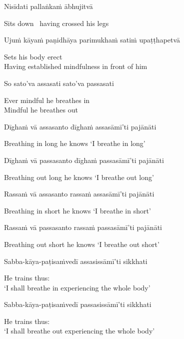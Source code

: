 Nisīdati pallaṅkaṁ ābhujitvā

\begin{english}
  Sits down \breathmark\ having crossed his legs
\end{english}

Ujuṁ kāyaṁ paṇidhāya parimukhaṁ satiṁ upaṭṭhapetvā

\begin{english}
  Sets his body erect\\
  Having established mindfulness in front of him
\end{english}

So sato'va assasati sato'va passasati

\begin{english}
  Ever mindful he breathes in\\
  Mindful he breathes out
\end{english}

Dīghaṁ vā assasanto dīghaṁ assasāmī'ti pajānāti

\begin{english}
  Breathing in long he knows `I breathe in long'
\end{english}

Dīghaṁ vā passasanto dīghaṁ passasāmī'ti pajānāti

\begin{english}
  Breathing out long he knows `I breathe out long'
\end{english}

Rassaṁ vā assasanto rassaṁ assasāmī'ti pajānāti

\begin{english}
  Breathing in short he knows `I breathe in short'
\end{english}

Rassaṁ vā passasanto rassaṁ passasāmī'ti pajānāti

\begin{english}
  Breathing out short he knows `I breathe out short'
\end{english}

Sabba-kāya-paṭisaṁvedī assasissāmī'ti sikkhati

\begin{english}
  He trains thus:\\
  `I shall breathe in experiencing the whole body'
\end{english}

Sabba-kāya-paṭisaṁvedī passasissāmī'ti sikkhati

\begin{english}
  He trains thus:\\
  `I shall breathe out experiencing the whole body'
\end{english}

